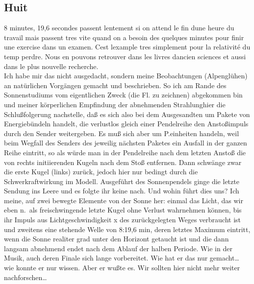 \documentclass[
]{article}
\author{}
\date{\vspace{-2.5em}}
\begin{document}
\subsection{Huit}\label{huit}

8 minutes, 19,6 secondes passent lentement si on attend le fin
d\textquotesingle une heure du travail mais passent tres vite quand on a
besoin des quelques minutes pour finir une exercise dans un examen.
C\textquotesingle est l\textquotesingle example tres simplement pour la
relativité du temp perdre. Nous en pouvons retrouver dans les livres
d\textquotesingle ancien sciences et aussi dans le plus nouvelle
recherche.\\
Ich habe mir das nicht ausgedacht, sondern meine Beobachtungen
(Alpenglühen) an natürlichen Vorgängen gemacht und beschrieben. So ich
am Rande des Sonnenstudiums vom eigentlichen Zweck (die Fl. zu zeichnen)
abgekommen bin und meiner körperlichen Empfindung der abnehmenden
Strahlunghier die Schlußfolgerung nachstelle, daß es sich also bei dem
Ausgesandten um Pakete von Energiebündeln handelt, die verlustlos gleich
einer Pendelreihe den Anstoßimpuls durch den Sender weitergeben. Es muß
sich aber um P.einheiten handeln, weil beim Wegfall des Senders des
jeweilig nächsten Paketes ein Ausfall in der ganzen Reihe eintritt, so
als würde man in der Pendelreihe nach dem letzten Anstoß die von rechts
initiierenden Kugeln nach dem Stoß entfernen. Dann schwänge zwar die
erste Kugel (links) zurück, jedoch hier nur bedingt durch die
Schwerkraftwirkung im Modell. Ausgeführt des Sonnenpendels ginge die
letzte Sendung ins Leere und es folgte ihr keine nach. Und wohin führt
dies uns? Ich meine, auf zwei bewegte Elemente von der Sonne her: einmal
das Licht, das wir eben n.~als freischwingende letzte Kugel ohne Verlust
wahrnehmen können, bis ihr Impuls aus Lichtgeschwindigkeit x des
zurückgelegten Weges verbraucht ist und zweitens eine stehende Welle von
8:19,6 min, deren letztes Maximum eintritt, wenn die Sonne realiter grad
unter den Horizont getaucht ist und die dann langsam abnehmend endet
nach dem Ablauf der halben Periode. Wie in der Musik, auch deren Finale
sich lange vorbereitet. Wie hat er das nur gemacht\ldots{} wie konnte er
nur wissen. Aber er wußte es. Wir sollten hier nicht mehr weiter
nachforschen\ldots{}
\end{document}
